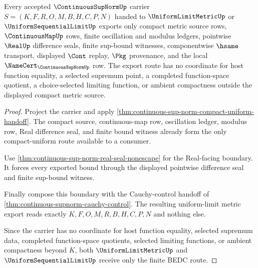 \begin{theorem}
\label{thm:continuous-sup-norm-uniform-limit-metric-export}
Every accepted $\ContinuousSupNormUp$ carrier $S=(K,F,R,O,M,B,H,C,P,N)$ handed to $\UniformLimitMetricUp$ or $\UniformSequentialLimitUp$ exports only compact metric source rows, $\ContinuousMapUp$ rows, finite oscillation and modulus ledgers, pointwise $\RealUp$ difference seals, finite sup-bound witnesses, componentwise $\hsame$ transport, displayed $\Cont$ replay, $\Pkg$ provenance, and the local $\NameCert_{\ContinuousSupNormUp}$ row. The export route has no coordinate for host function equality, a selected supremum point, a completed function-space quotient, a choice-selected limiting function, or ambient compactness outside the displayed compact metric source.
\end{theorem}
\begin{proof}
Project the carrier and apply \autoref{thm:continuous-sup-norm-compact-uniform-handoff}. The compact source, continuous-map row, oscillation ledger, modulus row, Real difference seal, and finite bound witness already form the only compact-uniform route available to a consumer.

Use \autoref{thm:continuous-sup-norm-real-seal-nonescape} for the Real-facing boundary. It forces every exported bound through the displayed pointwise difference seal and finite sup-bound witness.

Finally compose this boundary with the Cauchy-control handoff of \autoref{thm:continuous-supnorm-cauchy-control}. The resulting uniform-limit metric export reads exactly $K,F,O,M,R,B,H,C,P,N$ and nothing else.

Since the carrier has no coordinate for host function equality, selected supremum data, completed function-space quotients, selected limiting functions, or ambient compactness beyond $K$, both $\UniformLimitMetricUp$ and $\UniformSequentialLimitUp$ receive only the finite BEDC route.
\end{proof}

